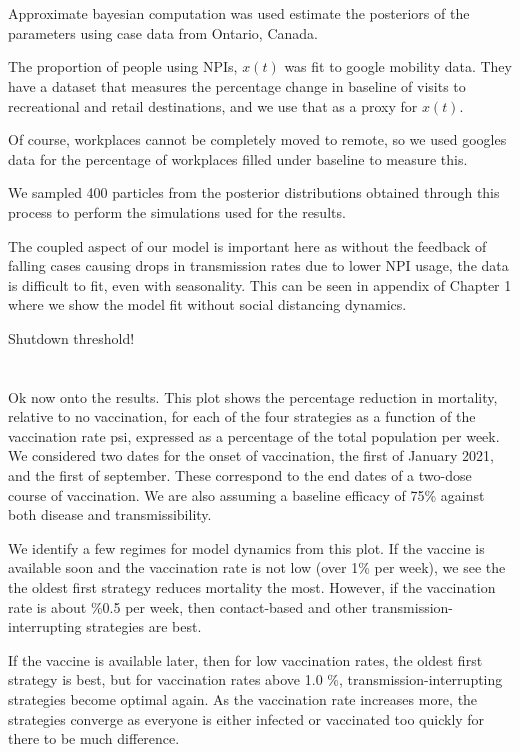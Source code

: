\documentclass{article}
\begin{document}
\section{}
Approximate bayesian computation was used estimate the posteriors of the parameters using case data from Ontario, Canada.

The proportion of people using NPIs, $x(t)$ was fit to google mobility data. They have a dataset that measures the percentage change in baseline of visits to recreational and retail destinations, and we use that as a proxy for $x(t)$.

Of course, workplaces cannot be completely moved to remote, so we used googles data for the percentage of workplaces filled under baseline to measure this.

We sampled 400 particles from the posterior distributions obtained through this process to perform the simulations used for the results.  

The coupled aspect of our model is important here as without the feedback of falling cases causing drops in transmission rates due to lower NPI usage, the data is difficult to fit, even with seasonality. This can be seen in appendix of Chapter 1 where we show the model fit without social distancing dynamics. 

Shutdown threshold!

\section{}


Ok now onto the results. This plot shows the percentage reduction in mortality, relative to no vaccination, for each of the four strategies as a function of the vaccination rate psi, expressed as a percentage of the total population per week. We considered two dates for the onset of vaccination, the first of January 2021, and the first of september. These correspond to the end dates of a two-dose course of vaccination. We are also assuming a baseline efficacy of 75\% against both disease and transmissibility.

We identify a few regimes for model dynamics from this plot. If the vaccine is available soon and the vaccination rate is not low (over 1\% per week), we see the the oldest first strategy reduces mortality the most. However, if the vaccination rate is about \%0.5 per week, then contact-based and other transmission-interrupting strategies are best.

If the vaccine is available later, then for low vaccination rates, the oldest first strategy is best, but for vaccination rates above 1.0   \%, transmission-interrupting strategies become optimal again. As the vaccination rate increases more, the strategies converge as everyone is either infected or vaccinated too quickly for there to be much difference.
\end{document}
